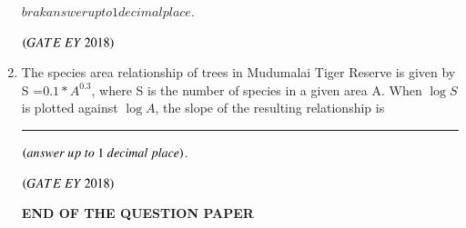 \documentclass[journal]{IEEEtran}
\numberwithin{equation}{enumi}
\numberwithin{figure}{enumi}
\begin{document}
\begin{enumerate}
$brak{answer up to 1 decimal place}$.
   
    \hfill{$\brak{ GATE\ EY\ 2018}$}
    \bigskip
 \item The species area relationship of trees in Mudumalai Tiger Reserve is given by
S =$0.1 * A^{0.3}$, where S is the number of species in a given area A. When $\log S$ is
plotted against $\log A$, the slope of the resulting relationship is\rule{3cm}{0.15mm}


$\brak{answer\ up\ to\ 1\ decimal\ place}$.
   
    \hfill{$\brak{ GATE\ EY\ 2018}$}
    \bigskip
    \begin{center}
\Large
\textbf{END OF THE QUESTION PAPER}
\end{center}
\end{enumerate}
\end{document}
